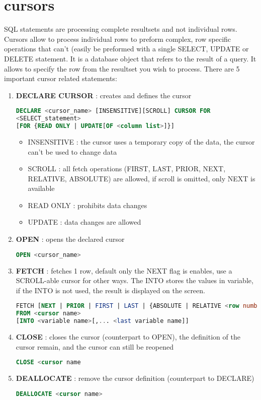 \documentclass{report}
\begin{document}
	 \section{cursors}
	 SQL statements are processing complete resultsets and not individual rows. Cursors allow to process individual rows to preform complex, row specific operations that can't (easily be preformed with a single SELECT, UPDATE or DELETE statement. It is a database object that refers to the result of a query. It allows to specify the row from the resultset you wish to process.
	There are 5 important cursor related statements: 
	\begin{enumerate}
		\item \textbf{DECLARE CURSOR} : creates and defines the cursor
		\begin{lstlisting}[language = sql]
DECLARE <cursor_name> [INSENSITIVE][SCROLL] CURSOR FOR
<SELECT_statement> 
[FOR {READ ONLY | UPDATE[OF <column list>]}]\end{lstlisting}
		\begin{itemize}
			\item INSENSITIVE : the cursor uses a temporary copy of the data, the cursor can't be used to change data 
			\item SCROLL : all fetch operations (FIRST, LAST, PRIOR, NEXT, RELATIVE, ABSOLUTE) are allowed, if scroll is omitted, only NEXT is available
			\item READ ONLY : prohibits data changes 
			\item UPDATE : data changes are allowed
		\end{itemize}
		\item \textbf{OPEN} : opens the declared cursor
		\begin{lstlisting}[language = sql]
OPEN <cursor_name>\end{lstlisting}
		\item \textbf{FETCH} : fetches 1 row, default only the NEXT flag is enables, use a SCROLL-able cursor for other ways. The INTO stores the values in variable, if the INTO is not used, the result is displayed on the screen.
		\begin{lstlisting}[language = sql]
FETCH [NEXT | PRIOR | FIRST | LAST | {ABSOLUTE | RELATIVE <row number>}]
FROM <cursor name>
[INTO <variable name>[,... <last variable name]]	\end{lstlisting}
		\item \textbf{CLOSE} : closes the cursor (counterpart to OPEN), the definition of the cursor remain, and the cursor can still be reopened
		\begin{lstlisting}[language = sql]
CLOSE <cursor name	\end{lstlisting}		
		\item \textbf{DEALLOCATE} : remove the cursor definition (counterpart to DECLARE)
		\begin{lstlisting}[language = sql]
DEALLOCATE <cursor name> \end{lstlisting}		
	\end{enumerate}
\end{document}
